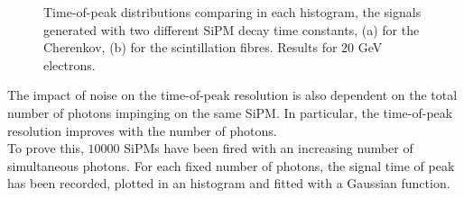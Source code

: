 \begin{figure}
	\centering
	 \quad
	\caption{Time-of-peak distributions comparing in each histogram, the signals generated with two different SiPM decay time constants, (a) for the Cherenkov, (b) for the scintillation fibres. Results for $20$ GeV electrons.}
	\label{fig:top_per_fib}
\end{figure}

The impact of noise on the time-of-peak resolution is also dependent on the total number of photons impinging on the same SiPM. In particular, the time-of-peak resolution improves with the number of photons.\\
To prove this, $10000$ SiPMs have been fired with an increasing number of simultaneous photons. For each fixed number of photons, the signal time of peak has been recorded, plotted in an histogram and fitted with a Gaussian function.\\

